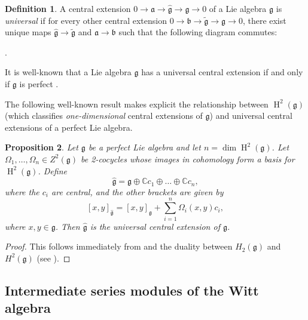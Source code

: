 \documentclass[11pt, svgnames]{amsart}
\newcommand{\g}{\ensuremath{\mathfrak{g}}}
\newcommand{\fa}{\mathfrak{a}}
\newcommand{\CC}{\mathbb{C}}
\DeclareMathOperator{\id}{id}
\DeclareMathOperator{\HH}{H}
\newtheorem{proposition}{Proposition}[section]
\theoremstyle{definition}
\newtheorem{defn}[proposition]{Definition}
\begin{document}
\begin{defn} \label{def: universal central extension}
    A central extension $0 \to \fa \to \widehat{\g} \to \g \to 0$ of a Lie algebra $\g$ is \emph{universal} if for every other central extension $0 \to \mathfrak{b} \to \widetilde{\g} \to \g \to 0$, there exist unique maps $\widehat{\g} \to \widetilde{\g}$ and $\mathfrak{a} \to \mathfrak{b}$ such that the following diagram commutes:
    \begin{center}
        .
    \end{center}
\end{defn}

It is well-known that a Lie algebra $\g$ has a universal central extension if and only if $\g$ is perfect \cite[Theorem 7.9.2]{Weibel}.

The following well-known result makes explicit the relationship between $\HH^2(\g)$ (which classifies \emph{one-dimensional} central extensions of $\g$) and universal central extensions of a perfect Lie algebra.
\begin{proposition}
    Let $\g$ be a perfect Lie algebra and let $n = \dim \HH^2(\g)$. Let $\Omega_1,\ldots,\Omega_n \in Z^2(\g)$ be 2-cocycles whose images in cohomology form a basis for $\HH^2(\g)$. Define
    $$\widehat{\g} = \g \oplus \CC c_1 \oplus \ldots \oplus \CC c_n,$$
    where the $c_i$ are central, and the other brackets are given by
    \begin{equation}\label{eq: universal extension}
        [x,y]_{\widehat{\g}} = [x,y]_\g + \sum_{i=1}^n \Omega_i(x,y)c_i,
    \end{equation}
    where $x,y \in \g$. Then $\widehat{\g}$ is the universal central extension of $\g$.
\end{proposition}
\begin{proof}
    This follows immediately from \cite[Theorem 7.9.2]{Weibel} and the duality between $H_2(\g)$ and $H^2(\g)$ (see \cite[p.16]{Fuchs}).
\end{proof}

\subsection{Intermediate series modules of the Witt algebra}
\end{document}
